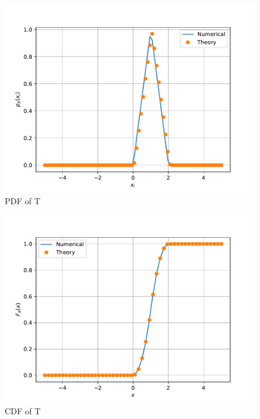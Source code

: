 \documentclass[journal,12pt,twocolumn]{IEEEtran}
\renewcommand\thesection{\arabic{section}}
\begin{document}
\begin{enumerate}[label=\thesection.\arabic*
,ref=\thesection.\theenumi]
\begin{figure}[h]
	\includegraphics[width=\columnwidth]{figs/4/T_pdf.pdf}
	\caption{PDF of T}
	\label{fig:T_pdf}
\end{figure}
	\begin{figure}[h]
		\centering
		\includegraphics[width=\columnwidth]{figs/4/T_cdf.pdf}
		\caption{CDF of T}
		\label{fig:T_cdf}
\end{figure}
\end{enumerate}
\end{document}

